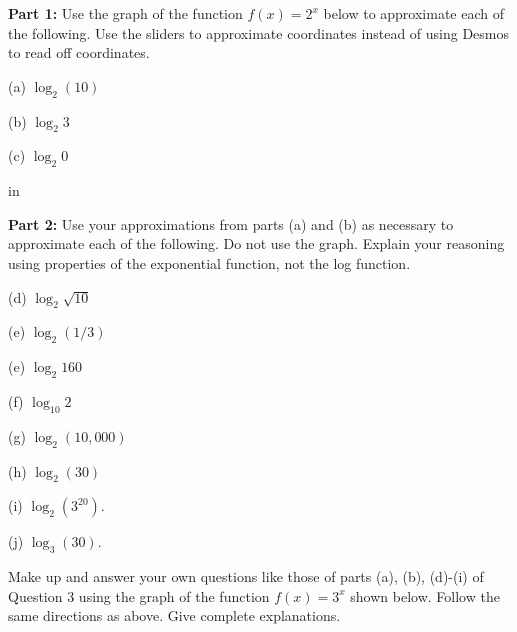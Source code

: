 \documentclass{ximera}
\newcommand{\pskip}{\vskip 0.1 in}
\begin{document}
\begin{question}  \label{Ex1:LogF}

{\bf Part 1:} Use the graph of the function $f(x)=2^x$ below to approximate each of the following. Use the sliders to approximate coordinates instead of using Desmos to read off coordinates.

(a) $\log_2 (10)$

(b) $\log_2 3$

(c) $\log_2 0$

\pskip

{\bf Part 2:} Use your approximations from parts (a) and (b) as necessary to approximate each of the following. Do not use the graph. Explain your reasoning using properties of the exponential function, not the log function.

(d) $\log_2 \sqrt{10}$

(e) $\log_2(1/3)$ 

(e)  $\log_2 160$ 

(f) $\log_{10} 2$ 

(g) $\log_2 (10,000)$

(h) $\log_2(30)$

(i) $\log_2(3^{20})$. 

(j) $\log_{3}(30)$.

\begin{exploration}
 
\begin{onlineOnly}
    \begin{center}
\end{center}
\end{onlineOnly}
\end{exploration}

\end{question}


\begin{question}  \label{Q111:LogF}
Make up and answer your own questions like those of parts (a), (b), (d)-(i) of Question 3 using the graph of the function $f(x)=3^x$ shown below. Follow the same directions as above. Give complete explanations.

\begin{exploration}
 
\begin{onlineOnly}
    \begin{center}
\end{center}
\end{onlineOnly}
\end{exploration}





\end{question}
\end{document}
